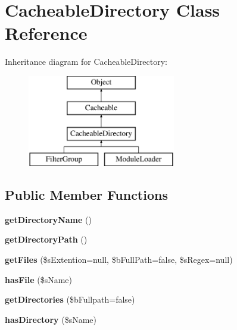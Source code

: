 \hypertarget{class_cacheable_directory}{\section{Cacheable\-Directory Class Reference}
\label{class_cacheable_directory}
}
Inheritance diagram for Cacheable\-Directory\-:\begin{figure}[H]
\begin{center}
\leavevmode
\includegraphics[height=4.000000cm]{class_cacheable_directory}
\end{center}
\end{figure}
\subsection*{Public Member Functions}
\begin{DoxyCompactItemize}
\item 
\hypertarget{class_cacheable_directory_af4a9614df1649ff5c9aef064693a7f39}{{\bfseries get\-Directory\-Name} ()}\label{class_cacheable_directory_af4a9614df1649ff5c9aef064693a7f39}

\item 
\hypertarget{class_cacheable_directory_ae6acd6c28aa00c6558b870921bda30f4}{{\bfseries get\-Directory\-Path} ()}\label{class_cacheable_directory_ae6acd6c28aa00c6558b870921bda30f4}

\item 
\hypertarget{class_cacheable_directory_aaf6d7dab40bb33ce689b9e9f1b9b42fb}{{\bfseries get\-Files} (\$s\-Extention=null, \$b\-Full\-Path=false, \$s\-Regex=null)}\label{class_cacheable_directory_aaf6d7dab40bb33ce689b9e9f1b9b42fb}

\item 
\hypertarget{class_cacheable_directory_ad261a152955b4a2a0b0941d5b2f69b52}{{\bfseries has\-File} (\$s\-Name)}\label{class_cacheable_directory_ad261a152955b4a2a0b0941d5b2f69b52}

\item 
\hypertarget{class_cacheable_directory_a1b4204c9f6797bcdfe5eb37c49515dc8}{{\bfseries get\-Directories} (\$b\-Fullpath=false)}\label{class_cacheable_directory_a1b4204c9f6797bcdfe5eb37c49515dc8}

\item 
\hypertarget{class_cacheable_directory_aa9b2ca0753abef71e5b148b8e1f0a50a}{{\bfseries has\-Directory} (\$s\-Name)}\label{class_cacheable_directory_aa9b2ca0753abef71e5b148b8e1f0a50a}

\end{DoxyCompactItemize}
